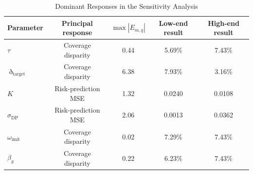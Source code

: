 \begin{table}[t]
\centering
\caption{Dominant Responses in the Sensitivity Analysis}
\label{tab:sensitivity_key}
\footnotesize
\renewcommand{\arraystretch}{1.10}
\begin{tabular}{lcccc}
\toprule
Parameter & Principal response & $\max |E_{m,q}|$ & Low-end result & High-end result \\
\midrule
$\tau$ & Coverage disparity & 0.44 & 5.69\% & 7.43\% \\
$\eth_{\mathrm{target}}$ & Coverage disparity & 6.38 & 7.93\% & 3.16\% \\
$K$ & Risk-prediction MSE & 1.32 & 0.0240 & 0.0108 \\
$\sigma_{\mathrm{DP}}$ & Risk-prediction MSE & 2.06 & 0.0013 & 0.0362 \\
$\omega_{\mathrm{imit}}$ & Coverage disparity & 0.02 & 7.29\% & 7.43\% \\
$\beta_g$ & Coverage disparity & 0.22 & 6.23\% & 7.43\% \\
\bottomrule
\end{tabular}
\end{table}
